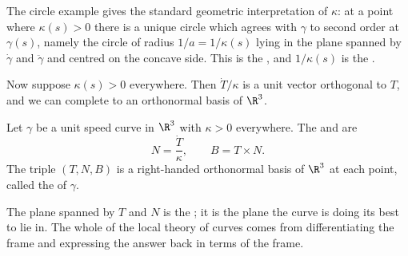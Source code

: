 The circle example gives the standard geometric interpretation of $\kappa$: at a point where $\kappa(s) > 0$ there is a unique circle which agrees with $\gamma$ to second order at $\gamma(s)$, namely the circle of radius $1/a = 1/\kappa(s)$ lying in the plane spanned by $\dot\gamma$ and $\ddot\gamma$ and centred on the concave side. This is the , and $1/\kappa(s)$ is the .

\begin{center}
\end{center}

Now suppose $\kappa(s) > 0$ everywhere. Then $\dot T/\kappa$ is a unit vector orthogonal to $T$, and we can complete to an orthonormal basis of $\R^3$.

\begin{definition}
    Let $\gamma$ be a unit speed curve in $\R^3$ with $\kappa > 0$ everywhere. The  and  are
    $$
    N = \frac{\dot T}{\kappa}, \qquad B = T \times N.
    $$
    The triple $(T, N, B)$ is a right-handed orthonormal basis of $\R^3$ at each point, called the  of $\gamma$.
\end{definition}

The plane spanned by $T$ and $N$ is the ; it is the plane the curve is doing its best to lie in. The whole of the local theory of curves comes from differentiating the frame and expressing the answer back in terms of the frame.

